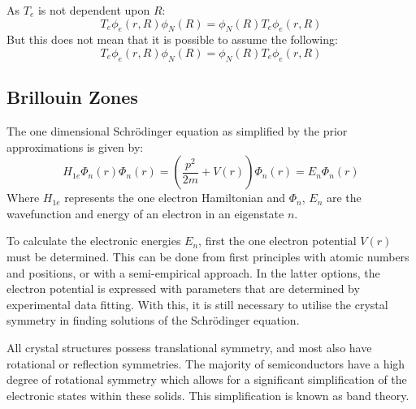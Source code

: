 As $T_{e}$ is not dependent upon $R$:
\begin{equation}
    T_{e}\phi_{e}\left(r,R\right)\phi_{N}\left(R\right) = \phi_{N}\left(R\right)T_{e}\phi_{e}\left(r,R\right)
    \label{eq:Te_dependence}
\end{equation}
But this does not mean that it is possible to assume the following:
\begin{equation}
    T_{e}\phi_{e}\left(r,R\right)\phi_{N}\left(R\right) = \phi_{N}\left(R\right)T_{e}\phi_{e}\left(r,R\right)
    \label{eq:Te_dependence}
\end{equation}


\subsection{Brillouin Zones}
The one dimensional Schr{\"o}dinger equation as simplified by the prior approximations is given by:
\begin{equation}
    H_{1e}\Phi_{n}\left(r\right)\Phi_{n}\left(r\right) = \left(\frac{p^{2}}{2m}+V\left(r\right)\right)\Phi_{n}\left(r\right) = E_{n}\Phi_{n}\left(r\right)
    \label{eq:schrodinger_1d_equation_motion_of_electrons}
\end{equation}
Where $H_{1e}$ represents the one electron Hamiltonian and $\Phi_{n}$, $E_{n}$ are the wavefunction and 
energy of an electron in an eigenstate $n$.

To calculate the electronic energies $E_{n}$, first the one electron potential $V\left(r\right)$ must be determined. This can be done from first principles with atomic numbers and positions, or with a semi-empirical approach. In the latter options, the electron potential is expressed with parameters that are determined by experimental data fitting. With this, it is still necessary to utilise the crystal symmetry in finding solutions of the Schr{\"o}dinger equation.

All crystal structures possess translational symmetry, and most also have rotational or reflection symmetries. The majority of semiconductors have a high degree of rotational symmetry which allows for a significant simplification of the electronic states within these solids. This simplification is known as band theory.

